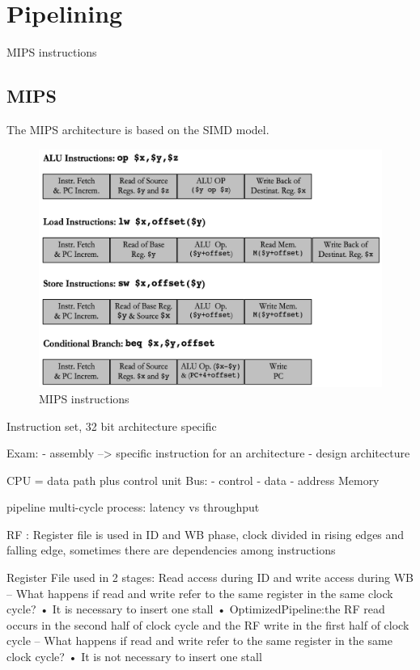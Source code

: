 \usepackage{booktabs}%

\section{Pipelining}\label{sec:pipeline}

MIPS instructions
\subsection{MIPS}\label{subsec:heterogeneous-systems}
The MIPS architecture is based on the SIMD model.
\begin{figure}
    \centering
    \includegraphics{images/MIPS-instructions}
    \caption{MIPS instructions}
    \label{fig: MIPS instructions}
\end{figure}
Instruction set, 32 bit
architecture specific

Exam:
- assembly --> specific instruction for an architecture
- design architecture

CPU = data path plus  control unit
Bus:
- control
- data
- address
Memory

pipeline multi-cycle process: latency vs throughput

RF : Register file is used in ID and WB phase, clock divided in rising edges and falling edge, sometimes there
are dependencies among instructions

Register File used in 2 stages: Read access during ID and write access during WB
– What happens if read and write refer to the same register in the same clock cycle?
• It is necessary to insert one stall
• OptimizedPipeline:the RF read occurs in the second half of clock cycle and the RF write in the first half of clock
cycle
– What happens if read and write refer to the same register in the same clock cycle?
• It is not necessary to insert one stall

